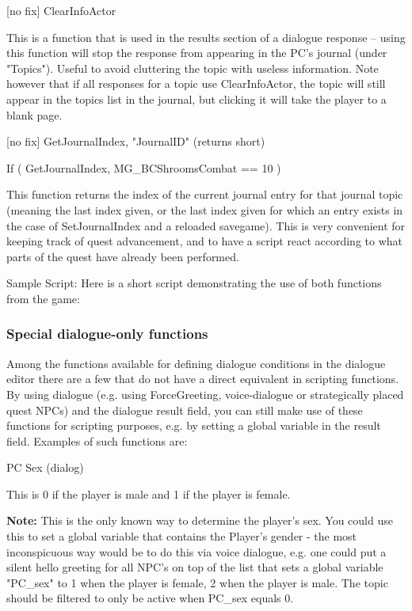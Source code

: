 \documentclass[
]{article}
\begin{document}
{[}no fix{]} ClearInfoActor

This is a function that is used in the results section of a dialogue
response -- using this function will stop the response from appearing in
the PC's journal (under "Topics"). Useful to avoid cluttering the topic
with useless information. Note however that if all responses for a topic
use ClearInfoActor, the topic will still appear in the topics list in
the journal, but clicking it will take the player to a blank page.

{[}no fix{]} GetJournalIndex, "JournalID" (returns short)

If ( GetJournalIndex, MG\_BCShroomsCombat == 10 )

This function returns the index of the current journal entry for that
journal topic (meaning the last index given, or the last index given for
which an entry exists in the case of SetJournalIndex and a reloaded
savegame). This is very convenient for keeping track of quest
advancement, and to have a script react according to what parts of the
quest have already been performed.

Sample Script: Here is a short script demonstrating the use of both
functions from the game:



\hypertarget{special-dialogue-only-functions}{%
\subsubsection{Special dialogue-only
functions}\label{special-dialogue-only-functions}}

Among the functions available for defining dialogue conditions in the
dialogue editor there are a few that do not have a direct equivalent in
scripting functions. By using dialogue (e.g. using ForceGreeting,
voice-dialogue or strategically placed quest NPCs) and the dialogue
result field, you can still make use of these functions for scripting
purposes, e.g. by setting a global variable in the result field.
Examples of such functions are:

PC Sex (dialog)

This is 0 if the player is male and 1 if the player is female.

\textbf{Note:} This is the only known way to determine the player's sex.
You could use this to set a global variable that contains the Player's
gender - the most inconspicuous way would be to do this via voice
dialogue, e.g. one could put a silent hello greeting for all NPC's on
top of the list that sets a global variable "PC\_sex" to 1 when the
player is female, 2 when the player is male. The topic should be
filtered to only be active when PC\_sex equals 0.
\end{document}

